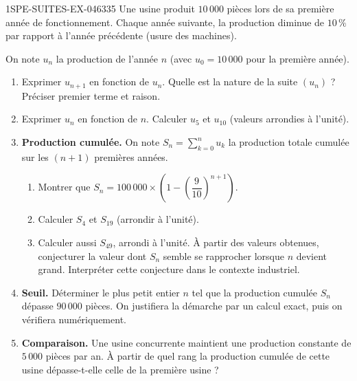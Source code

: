 \begin{exercice}{1SPE-SUITES-EX-046}{3}{35}
Une usine produit $10\,000$ pièces lors de sa première année de fonctionnement. Chaque année suivante, la production diminue de $10\,\%$ par rapport à l'année précédente (usure des machines).

On note $u_n$ la production de l'année $n$ (avec $u_0 = 10\,000$ pour la première année).

\begin{enumerate}
  \item Exprimer $u_{n+1}$ en fonction de $u_n$. Quelle est la nature de la suite $(u_n)$ ? Préciser premier terme et raison.

  \item Exprimer $u_n$ en fonction de $n$. Calculer $u_5$ et $u_{10}$ (valeurs arrondies à l'unité).

  \item \textbf{Production cumulée.} On note $S_n = \displaystyle\sum_{k=0}^{n} u_k$ la production totale cumulée sur les $(n+1)$ premières années.
  \begin{enumerate}
    \item Montrer que $S_n = 100\,000 \times \left(1 - \left(\dfrac{9}{10}\right)^{n+1}\right)$.
    \item Calculer $S_4$ et $S_{19}$ (arrondir à l'unité).
    \item Calculer aussi $S_{49}$, arrondi à l'unité. À partir des valeurs obtenues, conjecturer la valeur dont $S_n$ semble se rapprocher lorsque $n$ devient grand. Interpréter cette conjecture dans le contexte industriel.
  \end{enumerate}

  \item \textbf{Seuil.} Déterminer le plus petit entier $n$ tel que la production cumulée $S_n$ dépasse $90\,000$ pièces. On justifiera la démarche par un calcul exact, puis on vérifiera numériquement.

  \item \textbf{Comparaison.} Une usine concurrente maintient une production constante de $5\,000$ pièces par an. À partir de quel rang la production cumulée de cette usine dépasse-t-elle celle de la première usine ?
\end{enumerate}
\end{exercice}
